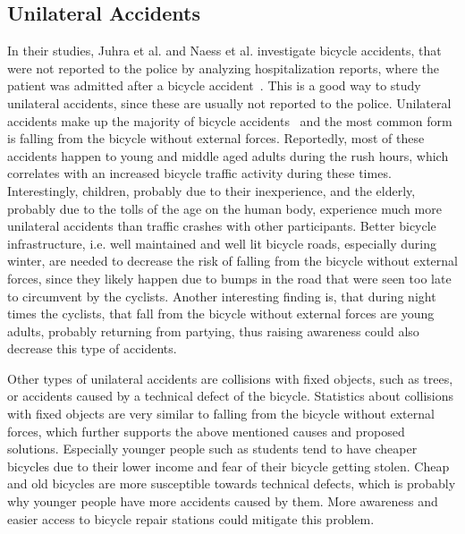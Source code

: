 \subsection*{Unilateral Accidents}
In their studies, Juhra et al. and Naess et al. investigate bicycle accidents, that were not reported to the police by analyzing hospitalization reports, where the patient was admitted after a bicycle accident~\cite{juhra2012bicycle,naess2020number}.
This is a good way to study unilateral accidents, since these are usually not reported to the police.
Unilateral accidents make up the majority of bicycle accidents~\cite{juhra2012bicycle,naess2020number} and the most common form is falling from the bicycle without external forces.
Reportedly, most of these accidents happen to young and middle aged adults during the rush hours, which correlates with an increased bicycle traffic activity during these times.
Interestingly, children, probably due to their inexperience, and the elderly, probably due to the tolls of the age on the human body, experience much more unilateral accidents than traffic crashes with other participants.
Better bicycle infrastructure, i.e. well maintained and well lit bicycle roads, especially during winter, are needed to decrease the risk of falling from the bicycle without external forces, since they likely happen due to bumps in the road that were seen too late to circumvent by the cyclists.
Another interesting finding is, that during night times the cyclists, that fall from the bicycle without external forces are young adults, probably returning from partying, thus raising awareness could also decrease this type of accidents.

Other types of unilateral accidents are collisions with fixed objects, such as trees, or accidents caused by a technical defect of the bicycle.
Statistics about collisions with fixed objects are very similar to falling from the bicycle without external forces, which further supports the above mentioned causes and proposed solutions.
Especially younger people such as students tend to have cheaper bicycles due to their lower income and fear of their bicycle getting stolen.
Cheap and old bicycles are more susceptible towards technical defects, which is probably why younger people have more accidents caused by them.
More awareness and easier access to bicycle repair stations could mitigate this problem.

